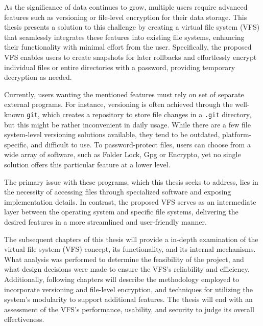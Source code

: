 

As the significance of data continues to grow, multiple users require advanced features such as versioning or file-level encryption for their data storage.
This thesis presents a solution to this challenge by creating a virtual file system (VFS) that seamlessly integrates these features into existing file systems, enhancing their functionality with minimal effort from the user.
Specifically, the proposed VFS enables users to create snapshots for later rollbacks and effortlessly encrypt individual files or entire directories with a password, providing temporary decryption as needed.

Currently, users wanting the mentioned features must rely on set of separate external programs.
For instance, versioning is often achieved through the well-known \texttt{git}, which creates a repository to store file changes in a \texttt{.git} directory, but this might be rather inconvenient in daily usage.
While there are a few file system-level versioning solutions available, they tend to be outdated, platform-specific, and difficult to use.
To password-protect files, users can choose from a wide array of software, such as Folder Lock, Gpg or Encrypto, yet no single solution offers this particular feature at a lower level.

The primary issue with these programs, which this thesis seeks to address, lies in the necessity of accessing files through specialized software and exposing implementation details.
In contrast, the proposed VFS serves as an intermediate layer between the operating system and specific file systems, delivering the desired features in a more streamlined and user-friendly manner.

The subsequent chapters of this thesis will provide a in-depth examination of the virtual file system (VFS) concept, its functionality, and its internal mechanisms.
What analysis was performed to determine the feasibility of the project, and what design decisions were made to ensure the VFS's reliability and efficiency.
Additionally, following chapters will describe the methodology employed to incorporate versioning and file-level encryption, and techniques for utilizing the system's modularity to support additional features.
The thesis will end with an assessment of the VFS's performance, usability, and security to judge its overall effectiveness.
